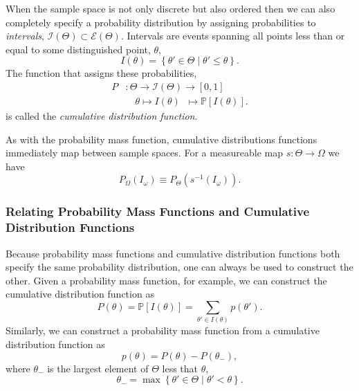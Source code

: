 \documentclass[11pt, oneside]{article}
\newcommand{\PP}{ \mathbb{P} }
\begin{document}
When the sample space is not only discrete but also ordered then we
can also completely specify a probability distribution by assigning
probabilities to \emph{intervals}, 
$\mathcal{I} \! \left( \Theta \right) \subset \mathcal{E} \! \left( \Theta \right)$.
Intervals are events spanning all points less than or equal to some 
distinguished point, $\theta$,
%
\begin{equation*}
I \! \left( \theta \right) = \left\{ \theta' \in \Theta \mid \theta' \leq \theta \right\}.
\end{equation*}
%
The function that assigns these probabilities,
%
\begin{align*}
P 
&: \Theta \rightarrow \mathcal{I} \! 
\left( \Theta \right) \rightarrow \left[0, 1 \right]
\\
&\quad \theta \mapsto 
I \! \left( \theta \right) \;\; \mapsto 
\PP \! \left[ I \! \left( \theta \right) \right].
\end{align*}
%
is called the \emph{cumulative distribution function}.  

As with the probability mass function, cumulative distributions functions
immediately map between sample spaces.  For a measureable map
$s : \Theta \rightarrow \Omega$ we have
%
\begin{equation*}
P_{\Omega} \! \left( I_{\omega} \right) 
\equiv 
P_{\Theta} \! \left( s^{-1} \! \left( I_{\omega} \right) \right).
\end{equation*}

\subsubsection{Relating Probability Mass Functions and Cumulative 
Distribution Functions}

Because probability mass functions and cumulative distribution functions both
specify the same probability distribution, one can always be used to construct
the other.  Given a probability mass function, for example, we can construct
the cumulative distribution function as
%
\begin{equation*}
P \! \left( \theta \right)
= \PP \! \left[ I \! \left( \theta \right) \right]
= \sum_{\theta' \in I ( \theta )} p \! \left( \theta' \right).
\end{equation*}
%
Similarly, we can construct a probability mass function from a cumulative
distribution function as
%
\begin{equation*}
p \! \left( \theta \right) = 
P \! \left( \theta \right)
- P \! \left( \theta_{-} \right),
\end{equation*}
%
where $\theta_{-}$ is the largest element of $\Theta$ less that $\theta$,
%
\begin{equation*}
\theta_{-} = \max \left\{ \theta' \in \Theta \mid \theta' < \theta \right\}.
\end{equation*}
\end{document}
